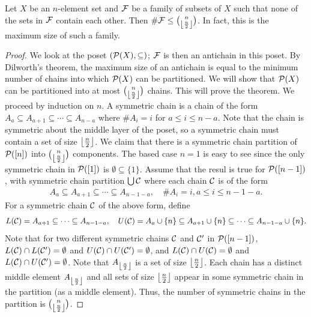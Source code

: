 \begin{theorem}
    Let $X$ be an $n$-element set and $\mathcal{F}$ be a family of subsets of $X$ such that none of the sets in $\mathcal{F}$ contain each other. Then $\# \mathcal{F} \leq \binom{n}{\left\lfloor \frac{n}{2} \right\rfloor}$. In fact, this is the maximum size of such a family.
\end{theorem}
\begin{proof}
    We look at the poset $(\mathcal{P}(X),\subseteq)$; $\mathcal{F}$ is then an antichain in this poset. By Dilworth's theorem, the maximum size of an antichain is equal to the minimum number of chains into which $\mathcal{P}(X)$ can be partitioned. We will show that $\mathcal{P}(X)$ can be partitioned into at most $\binom{n}{\left\lfloor \frac{n}{2} \right\rfloor}$ chains. This will prove the theorem. We proceed by induction on $n$. A symmetric chain is a chain of the form $A_{a} \subseteq A_{a+1} \subseteq \cdots \subseteq A_{n-a}$ where $\# A_{i} = i$ for $a \leq i \leq n-a$. Note that the chain is symmetric about the middle layer of the poset, so a symmetric chain must contain a set of size $\left\lfloor \frac{n}{2} \right\rfloor$. We claim that there is a symmetric chain partition of $\mathcal{P}([n])$ into $\binom{n}{\left\lfloor \frac{n}{2} \right\rfloor}$ components. The based case $n=1$ is easy to see since the only symmetric chain in $\mathcal{P}([1])$ is $\emptyset \subseteq \{1\}$. Assume that the resul is true for $\mathcal{P}([n-1])$, with symmetric chain partition $\bigcup \mathcal{C}$ where each chain $\mathcal{C}$ is of the form
    \begin{align}
        A_{a} \subseteq A_{a+1} \subseteq \cdots \subseteq A_{n-1-a}, \quad \# A_{i} = i, a \leq i \leq n-1-a.
    \end{align}
    For a symmetric chain $\mathcal{C}$ of the above form, define
    \begin{align}
        L(\mathcal{C}) = A_{a+1} \subseteq \cdots \subseteq A_{n-1-a},\quad U(\mathcal{C}) = A_{a} \cup \{n\} \subseteq A_{a+1} \cup \{n\} \subseteq \cdots \subseteq A_{n-1-a} \cup \{n\}.
    \end{align}
    Note that for two different symmetric chains $\mathcal{C}$ and $\mathcal{C}'$ in $\mathcal{P}([n-1])$, $L(\mathcal{C}) \cap L(\mathcal{C}') = \emptyset$ and $U(\mathcal{C}) \cap U(\mathcal{C}') = \emptyset$, and $L(\mathcal{C}) \cap U(\mathcal{C}) = \emptyset$ and $L(\mathcal{C}) \cap U(\mathcal{C}') = \emptyset$. Note that $A_{\left\lfloor \frac{n}{2} \right\rfloor}$ is a set of size $\left\lfloor \frac{n}{2} \right\rfloor$. Each chain has a distinct middle element $A_{\left\lfloor \frac{n}{2} \right\rfloor}$ and all sets of size $\left\lfloor \frac{n}{2} \right\rfloor$ appear in some symmetric chain in the partition (as a middle element). Thus, the number of symmetric chains in the partition is $\binom{n}{\left\lfloor \frac{n}{2} \right\rfloor}$.
\end{proof}

